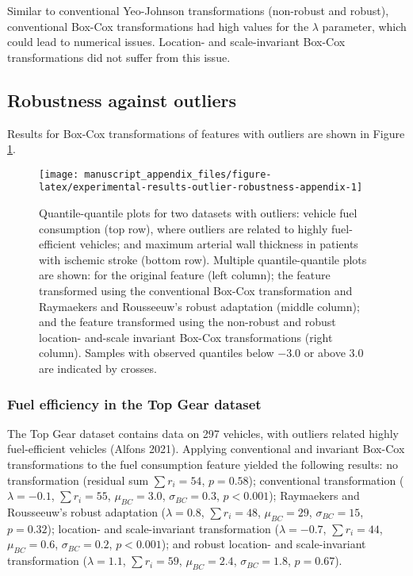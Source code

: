 \documentclass[
  a4paper,
]{article}
\begin{document}
Similar to conventional Yeo-Johnson transformations (non-robust and
robust), conventional Box-Cox transformations had high values for the
\(\lambda\) parameter, which could lead to numerical issues. Location-
and scale-invariant Box-Cox transformations did not suffer from this
issue.

\subsection{Robustness against
outliers}\label{robustness-against-outliers}

Results for Box-Cox transformations of features with outliers are shown
in Figure \ref{fig:experimental-results-outlier-robustness-appendix}.

\begin{figure}

{\centering \texttt{[image: manuscript\_appendix\_files/figure-latex/experimental-results-outlier-robustness-appendix-1]} 

}

\caption{Quantile-quantile plots for two datasets with outliers: vehicle fuel consumption (top row), where outliers are related to highly fuel-efficient vehicles; and maximum arterial wall thickness in patients with ischemic stroke (bottom row). Multiple quantile-quantile plots are shown: for the original feature (left column); the feature transformed using the conventional Box-Cox transformation and Raymaekers and Rousseeuw's robust adaptation (middle column); and the feature transformed using the non-robust and robust location- and-scale invariant Box-Cox transformations (right column). Samples with observed quantiles below $-3.0$ or above $3.0$ are indicated by crosses.}\label{fig:experimental-results-outlier-robustness-appendix}
\end{figure}

\subsubsection{Fuel efficiency in the Top Gear
dataset}\label{fuel-efficiency-in-the-top-gear-dataset}

The Top Gear dataset contains data on 297 vehicles, with outliers
related highly fuel-efficient vehicles (Alfons 2021). Applying
conventional and invariant Box-Cox transformations to the fuel
consumption feature yielded the following results: no transformation
(residual sum \(\sum r_i = 54\), \(p=0.58\)); conventional
transformation (\(\lambda = -0.1\), \(\sum r_i = 55\),
\(\mu_{BC} = 3.0\), \(\sigma_{BC} = 0.3\), \(p < 0.001\)); Raymaekers
and Rousseeuw's robust adaptation (\(\lambda = 0.8\), \(\sum r_i = 48\),
\(\mu_{BC} = 29\), \(\sigma_{BC} = 15\), \(p=0.32\)); location- and
scale-invariant transformation (\(\lambda = -0.7\), \(\sum r_i = 44\),
\(\mu_{BC} = 0.6\), \(\sigma_{BC} = 0.2\), \(p < 0.001\)); and robust
location- and scale-invariant transformation (\(\lambda = 1.1\),
\(\sum r_i = 59\), \(\mu_{BC} = 2.4\), \(\sigma_{BC} = 1.8\),
\(p=0.67\)).
\end{document}
